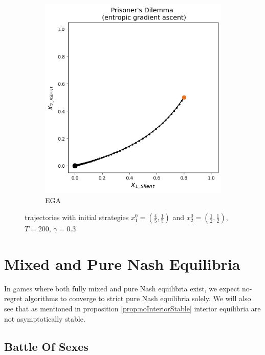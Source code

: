 \begin{figure}[H]
\begin{subfigure}{.5\textwidth}
    \includegraphics[width=\textwidth]{logos/Prisoner5.png}
    \caption{EGA}
\end{subfigure}
\caption{trajectories with initial strategies $x_{1}^0 = (\frac{4}{5},\frac{1}{5})$ and $x_{2}^0 = (\frac{1}{2},\frac{1}{2})$, $T = 200$, $\gamma = 0.3$}
\label{fig:Prisoner2}
\end{figure}





\section{Mixed and Pure Nash Equilibria}\label{section:MixedandPureNashEquilibria}

In games where both fully mixed and pure Nash equilibria exist, we expect no-regret algorithms to converge to strict pure Nash equilibria solely. We will also see that as mentioned in proposition \ref{prop:noInteriorStable} interior equilibria are not asymptotically stable.

\subsection{Battle Of Sexes}\label{subsection:battleOfSexes}

